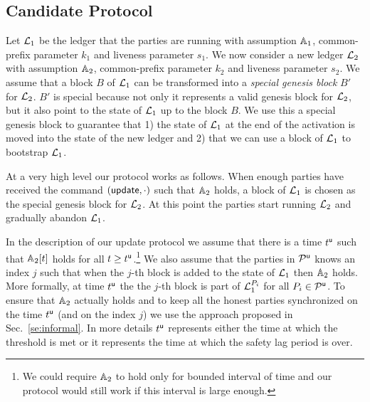 \subsection{Candidate Protocol}

Let $\mathcal{L}_1$ be the ledger that the parties are running with assumption $\mathbb{A}_1$, common-prefix parameter $k_1$ 
and  liveness parameter $s_1$. 
We now consider a new ledger $\mathcal{L}_2$ with assumption $\mathbb{A}_2$, common-prefix parameter $k_2$ and  liveness parameter $s_2$.
We assume that a block $B$ of $\mathcal{L}_1$ can be transformed into a \emph{special genesis block} $B'$ for $\mathcal{L}_2$. $B'$ is special because not only
it represents a valid genesis block for $\mathcal{L}_2$, but it also point to the state of $\mathcal{L}_1$ up to the block $B$. 
We use this a special genesis block to guarantee that 1) the state of $\mathcal{L}_1$ at the end of the activation is moved into the state of the new ledger
and 2) that we can use a block of $\mathcal{L}_1$ to bootstrap $\mathcal{L}_1$.

At a very high level our protocol works as follows. When enough parties have received the command $(\mathsf{update},\cdot)$ such that $\mathbb{A}_2$ holds,
a block of $\mathcal{L}_1$ is chosen as the special genesis block for $\mathcal{L}_2$. At this point the parties start running $\mathcal{L}_2$ and gradually abandon 
$\mathcal{L}_1$.

In the description of our update protocol we assume that there is a time $t^{\mathsf{u}}$ such that $\mathbb{A}_2[t]$ holds for all $t\geq t^{\mathsf{u}}$.\footnote{We could require $\mathbb{A}_2$ to
hold only for bounded interval of time and our protocol would still work if this interval is large enough.}
We also assume that the parties in $\mathcal{P}^\mathsf{u}$ knows an index $j$ such that when the $j$-th block is added to the state of $\mathcal{L}_1$ then $\mathbb{A}_2$ holds. 
More formally, at time $t^{\mathsf{u}}$ the the $j$-th block is part of $\mathcal{L}_1^{P_i}$ for all $P_i\in\mathcal{P}^\mathsf{u}$.
To ensure that $\mathbb{A}_2$ actually holds and to keep all the honest parties synchronized on the time $t^{\mathsf{u}}$ (and on the index $j$) we use the approach proposed in Sec.~\ref{se:informal}.
In more details $t^{\mathsf{u}}$ represents either the time at which the threshold is met or it represents the time at which the safety lag period is over.
 


